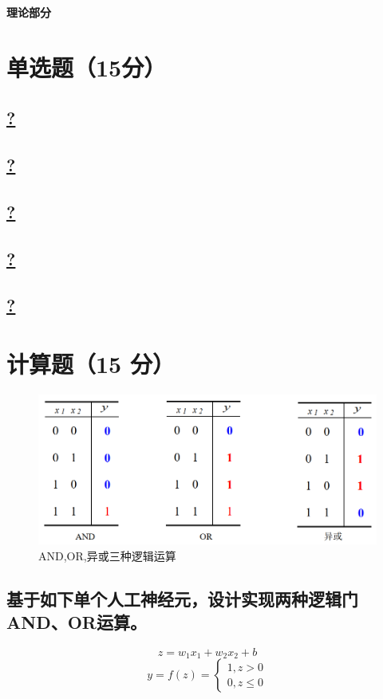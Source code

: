 \documentclass[a4paper]{article}
\begin{document}
\courseheader
{}
\vspace{3mm}
\centerline{\textbf{\Large{理论部分}}}

\section{单选题（15分）}
\subsection{\underline{?}}

\subsection{\underline{?}}

\subsection{\underline{?}}

\subsection{\underline{?}}

\subsection{\underline{?}}

\section{计算题（15 分）}

\begin{figure}[h]
    \centering
    \includegraphics[width=12cm]{Fig1.png}
    \caption{AND,OR,异或三种逻辑运算}
    \label{fig:label_1}
\end{figure}

\subsection{基于如下单个人工神经元，设计实现两种逻辑门AND、OR运算。}
\begin{equation}
    z=w_1x_1 +w_2x_2 + b
\end{equation}
\begin{equation}
y=f(z)=\left\{
        \begin{array}{lr}
        1, z > 0 \\
        0, z \leq 0
        \end{array}
\right.
\end{equation}
\end{document}
